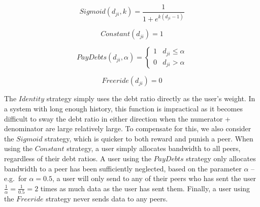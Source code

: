 \begin{equation}
    Sigmoid(d_{ji}, k) = \frac{1}{1 + e^{k (d_{ji} - 1)}}
\end{equation}

\begin{equation}
    Constant(d_{ji}) = 1
\end{equation}

\begin{equation}
    PayDebts(d_{ji}, \alpha) =
        \left\{\begin{array}{ll}
            1 & d_{ji} \leq \alpha \\
            0 & d_{ji} > \alpha
        \end{array}
        \right.
\end{equation}

\begin{equation}
    Freeride(d_{ji}) = 0
\end{equation}

The $Identity$ strategy simply uses the debt ratio directly as the user's weight. In
a system with long enough history, this function is impractical as it becomes difficult
to sway the debt ratio in either direction when the numerator + denominator are
large relatively large. To compensate for this, we also consider the $Sigmoid$ strategy,
which is quicker to both reward and punish a peer. When using the $Constant$ strategy,
a user simply allocates bandwidth to all peers, regardless of their debt ratios. A user
using the $PayDebts$ strategy only allocates bandwidth to a peer has been sufficiently
neglected, based on the parameter $\alpha$ -- e.g.\ for $\alpha = 0.5$, a user will only
send to any of their peers who has sent the user $\frac{1}{\alpha} = \frac{1}{0.5} = 2$
times as much data as the user has sent them. Finally, a user using the $Freeride$ strategy
never sends data to any peers.
